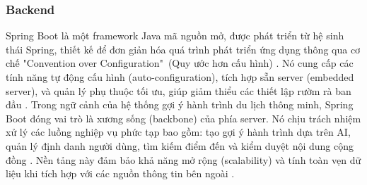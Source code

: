 \subsubsection{Backend}

Spring Boot là một framework Java mã nguồn mở, được phát triển từ hệ sinh thái Spring, thiết kế để đơn giản hóa quá trình phát triển ứng dụng thông qua cơ chế "Convention over Configuration"\ (Quy ước hơn cấu hình) \cite{walls-2022}. Nó cung cấp các tính năng tự động cấu hình (auto-configuration), tích hợp sẵn server (embedded server), và quản lý phụ thuộc tối ưu, giúp giảm thiểu các thiết lập rườm rà ban đầu \cite{spring-boot-ref}.
Trong ngữ cảnh của hệ thống gợi ý hành trình du lịch thông minh, Spring Boot đóng vai trò là xương sống (backbone) của phía server. Nó chịu trách nhiệm xử lý các luồng nghiệp vụ phức tạp bao gồm: tạo gợi ý hành trình dựa trên AI, quản lý định danh người dùng, tìm kiếm điểm đến và kiểm duyệt nội dung cộng đồng \cite{musib-2020}. Nền tảng này đảm bảo khả năng mở rộng (scalability) và tính toàn vẹn dữ liệu khi tích hợp với các nguồn thông tin bên ngoài \cite{webb-2020}.
